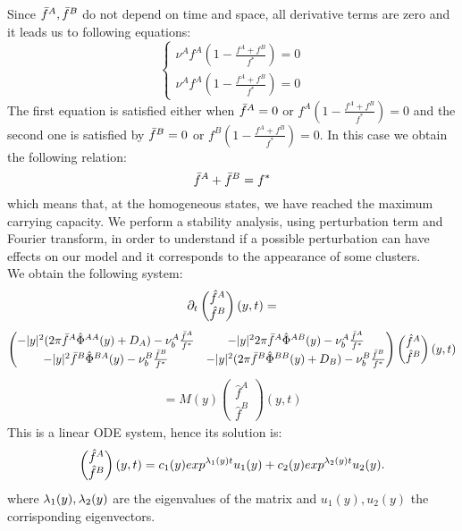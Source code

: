 Since ${\bar{f}^A},{\bar{f}^B}$ do not depend on time and space, all derivative terms are zero and it leads us to following equations:
$$
\begin{cases}
	\nu^{A}f^A\left( 1-\frac{f^A+f^B}{f^{*}} \right)=0 \\
	\nu^{A}f^A\left( 1-\frac{f^A+f^B}{f^{*}} \right)=0
\end{cases}
$$
The first equation is satisfied either when ${\bar{f}^A}=0$ or $f^A\left( 1-\frac{f^A+f^B}{f^{*}} \right)=0$ and the second one is satisfied by ${\bar{f}^B}=0$ or $f^B\left( 1-\frac{f^A+f^B}{f^{*}} \right)=0$. In this case we obtain the following relation:  
$$ {\bar{f}^A}+{\bar{f}^B}=f^* $$
which means that, at the homogeneous states, we have reached the maximum carrying capacity. 
We perform a stability analysis, using perturbation term and Fourier transform, in order to understand if a possible perturbation can have effects on our model and it corresponds to the appearance of some clusters. \\
We obtain the following system:
\begin{align}
{\partial}_t \begin{pmatrix} \hat{f}^A \\ \hat{f}^B
\end{pmatrix}(y,t)=
\end{align}
\begin{align}
\begin{pmatrix} -|y|^2(2\pi{\bar{f}^A}{\hat{\Phi}^{AA}}(y)+D_A)-\nu_{b}^A\frac{{\bar{f}^A}}{f^*} & -|y|^22\pi{\bar{f}^A}{\hat{\Phi}^{AB}}(y)-\nu_{b}^A\frac{{\bar{f}^A}}{f^*} \\ 
-|y|^2{\bar{f}^B}{\hat{\Phi}^{BA}}(y)-\nu_{b}^B\frac{{\bar{f}^B}}{f^*} & -|y|^2(2\pi{\bar{f}^B}{\hat{\Phi}^{BB}}(y)+D_B)-\nu_{b}^B\frac{{\bar{f}^B}}{f^*} 
\end{pmatrix}
\begin{pmatrix} \hat{f}^A \\ \hat{f}^B
\end{pmatrix}(y,t)
\end{align}
\begin{align}
=M(y)\begin{pmatrix} \hat{f}^A \\ \hat{f}^B
\end{pmatrix}(y,t)
\end{align}
This is a linear ODE system, hence its solution is:
$$
\begin{pmatrix} \hat{f}^A \\ \hat{f}^B
\end{pmatrix}(y,t)=c_1(y)exp^{{\lambda}_1(y)t}u_1(y)+c_2(y)exp^{{\lambda}_2(y)t}u_2(y).
$$
where ${\lambda}_1(y), {\lambda}_2(y)$ are the eigenvalues of the matrix and $u_1(y),u_2(y)$ the corrisponding eigenvectors. 
